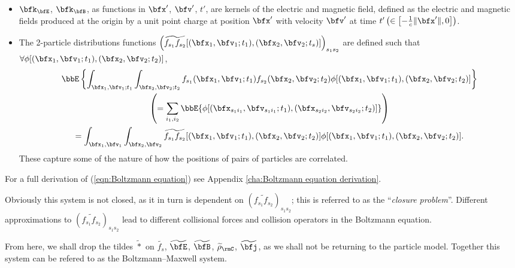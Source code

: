     \begin{itemize}
        \item  $\bfk_{\bfE}$, $\bfk_{\bfB}$, as functions in $\bfx'$, $\bfv'$, $t'$, are kernels of the electric and magnetic field, defined as the electric and magnetic fields produced at the origin by a unit point charge at position $\bfx'$ with velocity $\bfv'$ at time $t' \left(\in \left[-\frac{1}{c}\|\bfx'\|, 0\right]\right)$. 
        
        \item  The 2-particle distributions functions $\left(\widetilde{f_{s_{1}}f_{s_{2}}}[(\bfx_{1}, \bfv_{1}; t_{1}), (\bfx_{2}, \bfv_{2}; t_{s})]\right)_{s_{1}s_{2}}$ are defined such that $\forall \phi[(\bfx_{1}, \bfv_{1}; t_{1}), (\bfx_{2}, \bfv_{2}; t_{2})]$,
        \begin{multline}
            \bbE\left\{\int_{\bfx_{1}, \bfv_{1}; t_{1}}\int_{\bfx_{2}, \bfv_{2}; t_{2}}f_{s_{1}}(\bfx_{1}, \bfv_{1}; t_{1})f_{s_{2}}(\bfx_{2}, \bfv_{2}; t_{2})\phi[(\bfx_{1}, \bfv_{1}; t_{1}), (\bfx_{2}, \bfv_{2}; t_{2})]\right\}  \\
            \left(=  \sum_{i_{1}, i_{2}}\bbE\{\phi[(\bfx_{s_{1}i_{1}}, \bfv_{s_{1}i_{1}}; t_{1}), (\bfx_{s_{2}i_{2}}, \bfv_{s_{2}i_{2}}; t_{2})]\}\right)  \\
            =  \int_{\bfx_{1}, \bfv_{1}}\int_{\bfx_{2}, \bfv_{2}}\widetilde{f_{s_{1}}f_{s_{2}}}[(\bfx_{1}, \bfv_{1}; t_{1}), (\bfx_{2}, \bfv_{2}; t_{2})]\phi[(\bfx_{1}, \bfv_{1}; t_{1}), (\bfx_{2}, \bfv_{2}; t_{2})].
        \end{multline}
        These capture some of the nature of how the positions of pairs of particles are correlated.
    \end{itemize}
    For a full derivation of (\ref{eqn:Boltzmann equation}) see Appendix \ref{cha:Boltzmann equation derivation}.

    Obviously this system is not closed, as it in turn is dependent on $\left(\widetilde{f_{s_{1}}f_{s_{2}}}\right)_{s_{1}s_{2}}$; this is referred to as the ``\emph{closure problem}''. Different approximations to $\left(\widetilde{f_{s_{1}}f_{s_{2}}}\right)_{s_{1}s_{2}}$ lead to different collisional forces and collision operators in the Boltzmann equation.

    \shortline

    From here, we shall drop the tildes $\widetilde{*}$ on $\widetilde{f_{s}}$, $\widetilde{\bfE}$, $\widetilde{\bfB}$, $\widetilde{\rho}_{\rmC}$, $\widetilde{\bfj}$, as we shall not be returning to the particle model. Together this system can be refered to as the Boltzmann--Maxwell system.

